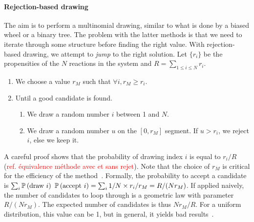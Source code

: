 \paragraph{Rejection-based drawing} The aim is to perform a multinomial drawing, similar to what is done by a biased wheel or a binary tree. The problem with the latter methods is that we need to iterate through some structure before finding the right value. With rejection-based drawing, we attempt to \emph{jump} to the right solution. Let $\{r_i\}$ be the propensities of the $N$ reactions in the system and $R = \sum_{1 \leq i \leq N} r_i$.
\begin{enumerate}
\item We choose a value $r_M$ such that $\forall i, r_M \geq r_i$.
\item Until a good candidate is found.
  \begin{enumerate}
  \item We draw a random number $i$ between 1 and $N$.
  \item We draw a random number $u$ on the $[0, r_M]$ segment. If $u > r_i$, we reject $i$, else we keep it.
  \end{enumerate}
\end{enumerate}

A careful proof shows that the probability of drawing index $i$ is equal to $r_i / R$ (\textcolor{red}{ref. équivalence méthode avec et sans rejet}). Note that the choice of $r_M$ is critical for the efficiency of the method~. Formally, the probability to accept a candidate is $\sum_i\mathbb{P}\left(\textrm{draw }i\right)$ $\mathbb{P}\left(\textrm{accept }i\right) = \sum_i1/N \times r_i/r_M = R/(Nr_M)$. If applied naively, the number of candidates to loop through is a geometric law with parameter $R/(Nr_M)$. The expected number of candidates is thus $Nr_M/R$. For a uniform distribution, this value can be 1, but in general, it yields bad results~.

